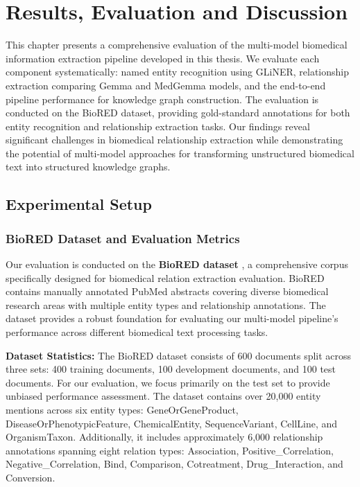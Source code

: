 
\chapter{Results, Evaluation and Discussion} %

\label{Chapter4} %


This chapter presents a comprehensive evaluation of the multi-model biomedical information extraction pipeline developed in this thesis. We evaluate each component systematically: named entity recognition using GLiNER, relationship extraction comparing Gemma and MedGemma models, and the end-to-end pipeline performance for knowledge graph construction. The evaluation is conducted on the BioRED dataset, providing gold-standard annotations for both entity recognition and relationship extraction tasks. Our findings reveal significant challenges in biomedical relationship extraction while demonstrating the potential of multi-model approaches for transforming unstructured biomedical text into structured knowledge graphs.


\section{Experimental Setup}

\subsection{BioRED Dataset and Evaluation Metrics}

Our evaluation is conducted on the \textbf{BioRED dataset} \parencite{BioRED}, a comprehensive corpus specifically designed for biomedical relation extraction evaluation. BioRED contains manually annotated PubMed abstracts covering diverse biomedical research areas with multiple entity types and relationship annotations. The dataset provides a robust foundation for evaluating our multi-model pipeline's performance across different biomedical text processing tasks.

\textbf{Dataset Statistics:} The BioRED dataset consists of 600 documents split across three sets: 400 training documents, 100 development documents, and 100 test documents. For our evaluation, we focus primarily on the test set to provide unbiased performance assessment. The dataset contains over 20,000 entity mentions across six entity types: GeneOrGeneProduct, DiseaseOrPhenotypicFeature, ChemicalEntity, SequenceVariant, CellLine, and OrganismTaxon. Additionally, it includes approximately 6,000 relationship annotations spanning eight relation types: Association, Positive\_Correlation, Negative\_Correlation, Bind, Comparison, Cotreatment, Drug\_Interaction, and Conversion.

